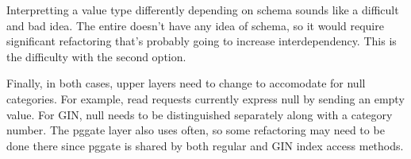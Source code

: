 Interpretting a value type differently depending on schema sounds like a
difficult and bad idea.  The entire  doesn't have any
idea of schema, so it would require significant refactoring that's probably
going to increase interdependency.  This is the difficulty with the second
option.

Finally, in both cases, upper layers need to change to accomodate for null
categories.  For example, read requests currently express null by sending an
empty value.  For GIN, null needs to be distinguished separately along with a
category number.  The pggate layer also uses  often, so
some refactoring may need to be done there since pggate is shared by both
regular and GIN index access methods.
